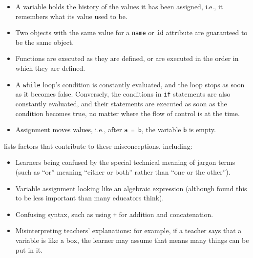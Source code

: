\begin{itemize}

\item
  A variable holds the history of the values it has been assigned,
  i.e., it remembers what its value used to be.

\item
  Two objects with the same value for a \texttt{name} or \texttt{id}
  attribute are guaranteed to be the same object.

\item
  Functions are executed as they are defined, or are executed in the
  order in which they are defined.

\item
  A \texttt{while} loop's condition is constantly evaluated, and the
  loop stops as soon as it becomes false.  Conversely, the conditions
  in \texttt{if} statements are also constantly evaluated, and their
  statements are executed as soon as the condition becomes true, no
  matter where the flow of control is at the time.

\item
  Assignment moves values, i.e., after \texttt{a = b}, the variable
  \texttt{b} is empty.

\end{itemize}

\cite{Qian2017} lists factors that contribute to these misconceptions,
including:

\begin{itemize}

\item
  Learners being confused by the special technical meaning of jargon
  terms (such as ``or'' meaning ``either or both'' rather than ``one
  or the other'').

\item
  Variable assignment looking like an algebraic expression (although
  \cite{Brow2018} found this to be less important than many
  educators think).

\item
  Confusing syntax, such as using \texttt{+} for addition and
  concatenation.

\item
  Misinterpreting teachers' explanations: for example, if a teacher
  says that a variable is like a box, the learner may assume that
  means many things can be put in it.

\end{itemize}

